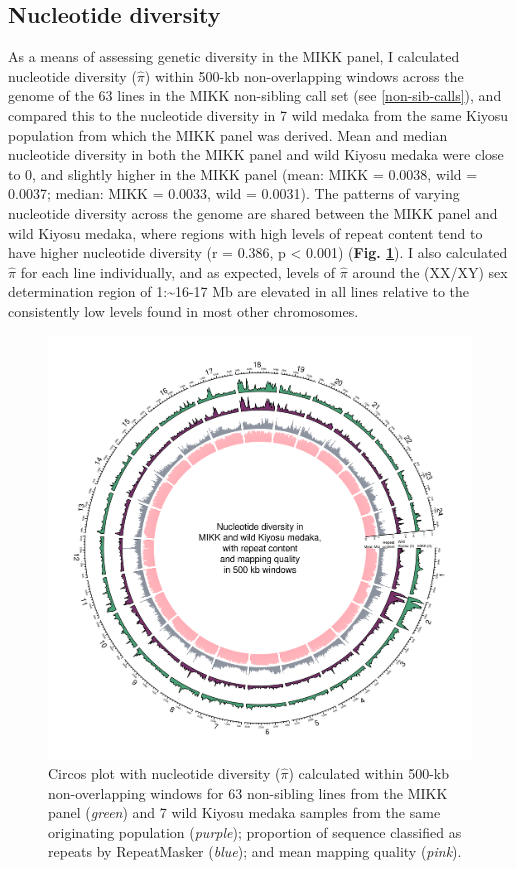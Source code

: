 \documentclass[
  9pt,
]{book}
\begin{document}
\hypertarget{nuc-div}{%
\subsection{Nucleotide diversity}\label{nuc-div}}

As a means of assessing genetic diversity in the MIKK panel, I calculated nucleotide diversity (\(\hat{\pi}\)) within 500-kb non-overlapping windows across the genome of the 63 lines in the MIKK non-sibling call set (see \ref{non-sib-calls}), and compared this to the nucleotide diversity in 7 wild medaka from the same Kiyosu population from which the MIKK panel was derived. Mean and median nucleotide diversity in both the MIKK panel and wild Kiyosu medaka were close to 0, and slightly higher in the MIKK panel (mean: MIKK = 0.0038, wild = 0.0037; median: MIKK = 0.0033, wild = 0.0031). The patterns of varying nucleotide diversity across the genome are shared between the MIKK panel and wild Kiyosu medaka, where regions with high levels of repeat content tend to have higher nucleotide diversity (r = 0.386, p \textless{} 0.001) (\textbf{Fig. \ref{fig:NucleotideDiversity}}). I also calculated \(\hat{\pi}\) for each line individually, and as expected, levels of \(\hat{\pi}\) around the (XX/XY) sex determination region of 1:\textasciitilde16-17 Mb are elevated in all lines relative to the consistently low levels found in most other chromosomes.



\begin{figure}
\includegraphics[width=1\linewidth]{figs/mikk_genome/supp_01_pi_circos} \caption{Circos plot with nucleotide diversity (\(\hat{\pi}\)) calculated within 500-kb non-overlapping windows for 63 non-sibling lines from the MIKK panel (\emph{green}) and 7 wild Kiyosu medaka samples from the same originating population (\emph{purple}); proportion of sequence classified as repeats by RepeatMasker (\emph{blue}); and mean mapping quality (\emph{pink}).}\label{fig:NucleotideDiversity}
\end{figure}
\end{document}

